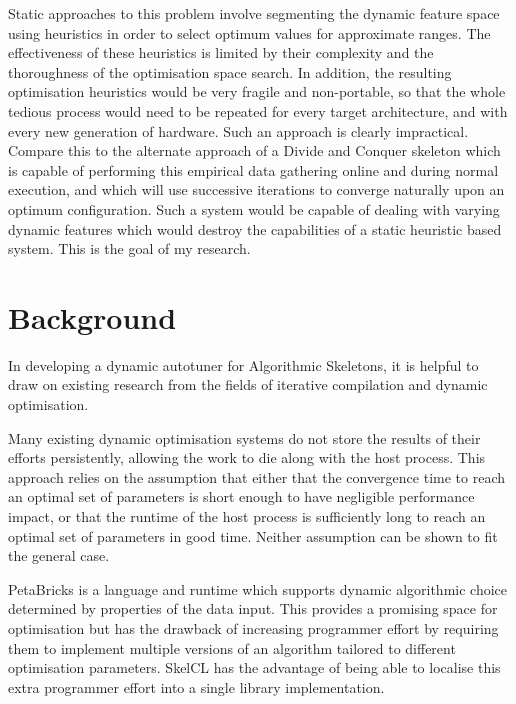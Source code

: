 Static approaches to this problem involve segmenting the dynamic
feature space using heuristics in order to select optimum values for
approximate ranges. The effectiveness of these heuristics is limited
by their complexity and the thoroughness of the optimisation space
search. In addition, the resulting optimisation heuristics would be
very fragile and non-portable, so that the whole tedious process would
need to be repeated for every target architecture, and with every new
generation of hardware. Such an approach is clearly
impractical. Compare this to the alternate approach of a Divide and
Conquer skeleton which is capable of performing this empirical data
gathering online and during normal execution, and which will use
successive iterations to converge naturally upon an optimum
configuration. Such a system would be capable of dealing with varying
dynamic features which would destroy the capabilities of a static
heuristic based system. This is the goal of my research.

\section{Background}

In developing a dynamic autotuner for Algorithmic Skeletons, it is
helpful to draw on existing research from the fields of iterative
compilation and dynamic optimisation.

Many existing dynamic optimisation systems do not store the results of
their efforts persistently, allowing the work to die along with the
host process. This approach relies on the assumption that either that
the convergence time to reach an optimal set of parameters is short
enough to have negligible performance impact, or that the runtime of
the host process is sufficiently long to reach an optimal set of
parameters in good time. Neither assumption can be shown to fit the
general case.

PetaBricks is a language and runtime which supports dynamic
algorithmic choice determined by properties of the data input. This
provides a promising space for optimisation but has the drawback of
increasing programmer effort by requiring them to implement multiple
versions of an algorithm tailored to different optimisation
parameters. SkelCL has the advantage of being able to localise this
extra programmer effort into a single library implementation.

